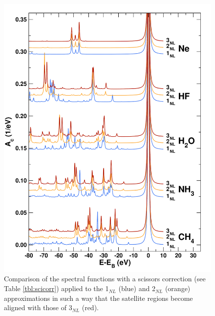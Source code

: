\documentclass[aps,prb,preprint,groupaddress,floatfix]{revtex4}
\begin{document}
\begin{figure}[t]
\includegraphics[scale=0.40,clip]{Fig06-SI.pdf}
\caption{\label{fig:ac_sci}
Comparison of the spectral functions with a scissors correction (see Table \ref{tbl:scicorr}) applied to the 1$_{NL}$ (blue) and 2$_{NL}$ (orange) approximations in such a way that the satellite regions become aligned with those of 3$_{NL}$ (red).
}
\end{figure}



\end{document}
